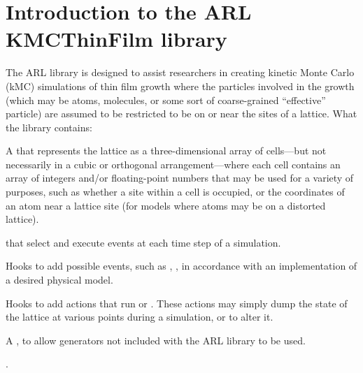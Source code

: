 \chapter{Introduction to the ARL KMCThin\+Film library}
\hypertarget{index}{}\label{index}
The ARL  library is designed to assist researchers in creating kinetic Monte Carlo (k\+MC) simulations of thin film growth where the particles involved in the growth (which may be atoms, molecules, or some sort of coarse-\/grained ``effective'' particle) are assumed to be restricted to be on or near the sites of a lattice. What the library contains\+:


\begin{DoxyItemize}
\item A  that represents the lattice as a three-\/dimensional array of cells---but not necessarily in a cubic or orthogonal arrangement---where each cell contains an array of integers and/or floating-\/point numbers that may be used for a variety of purposes, such as whether a site within a cell is occupied, or the coordinates of an atom near a lattice site (for models where atoms may be on a distorted lattice).
\item {} that select and execute events at each time step of a simulation.
\item Hooks to add possible events, such as , , in accordance with an implementation of a desired physical model.
\item Hooks to add actions that run  or . These actions may simply dump the state of the lattice at various points during a simulation, or to alter it.
\item A , to allow generators not included with the ARL  library to be used.
\item {}.
\end{DoxyItemize}

